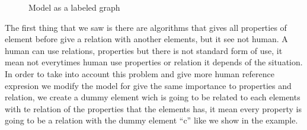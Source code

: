 \begin{figure}[ht]
\begin{minipage}[b]{0.5\linewidth}
\caption{Model as a labeled graph}
\label{GRE3D7-stimulus-graph}
\end{minipage}
\end{figure}



The first thing that we saw is there are algorithms that gives all properties of element before give a relation with another elements, but it see not human. A human can use relations, properties but there is not standard form of use, it mean not everytimes human use properties or relation it depends of the situation. In order to take into account this problem and give more human reference expresion we modify the model for give the same importance to properties and relation, we create a dummy element wich is going to be related to each elements with te relation of the properties that the elements has, it mean every property is going to be a relation with the dummy element ``c'' like we show in the example.

